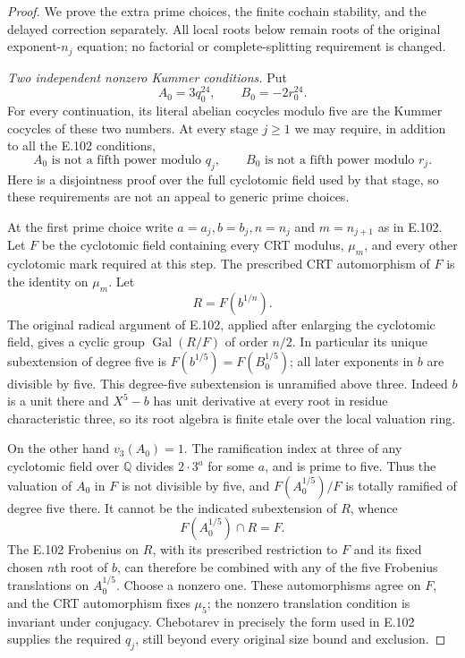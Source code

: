 \begin{proof}
We prove the extra prime choices, the finite cochain stability, and
the delayed correction separately.  All local roots below remain
roots of the original exponent-$n_j$ equation; no factorial or
complete-splitting requirement is changed.

\emph{Two independent nonzero Kummer conditions.}
Put
\[
                  A_0=3q_0^{24},\qquad B_0=-2r_0^{24}.
 \tag{E.205.4}
\]
For every continuation, its literal abelian cocycles modulo five
are the Kummer cocycles of these two numbers.  At every stage
$j\geq1$ we may require, in addition to all the E.102 conditions,
\[
 A_0\text{ is not a fifth power modulo }q_j,\qquad
 B_0\text{ is not a fifth power modulo }r_j.
 \tag{E.205.5}
\]
Here is a disjointness proof over the full cyclotomic field used
by that stage, so these requirements are not an appeal to
generic prime choices.

At the first prime choice write $a=a_j,b=b_j,n=n_j$ and
$m=n_{j+1}$ as in E.102.  Let $F$ be the cyclotomic field
containing every CRT modulus, $\mu_m$, and every other
cyclotomic mark required at this step.  The prescribed CRT
automorphism of $F$ is the identity on $\mu_m$.  Let
\[
                       R=F(b^{1/n}).
\]
The original radical argument of E.102, applied after enlarging
the cyclotomic field, gives a cyclic group
$\operatorname{Gal}(R/F)$ of order $n/2$.
In particular its unique subextension of degree five is
$F(b^{1/5})=F(B_0^{1/5})$; all later exponents in $b$ are
divisible by five.  This degree-five subextension is unramified
above three.  Indeed $b$ is a unit there and $X^5-b$ has unit
derivative at every root in residue characteristic three, so its
root algebra is finite etale over the local valuation ring.

On the other hand $v_3(A_0)=1$.  The ramification index at three
of any cyclotomic field over $\mathbb Q$ divides
$2\cdot3^a$ for some $a$, and is prime to five.  Thus the
valuation of $A_0$ in $F$ is not divisible by five, and
$F(A_0^{1/5})/F$ is totally ramified of degree five there.
It cannot be the indicated subextension of $R$, whence
\[
                       F(A_0^{1/5})\cap R=F.
 \tag{E.205.6}
\]
The E.102 Frobenius on $R$, with its prescribed restriction to
$F$ and its fixed chosen $n$th root of $b$, can therefore be
combined with any of the five Frobenius translations on
$A_0^{1/5}$.  Choose a nonzero one.  These automorphisms agree
on $F$, and the CRT automorphism fixes $\mu_5$; the nonzero
translation condition is invariant under conjugacy.  Chebotarev
in precisely the form used in E.102 supplies the required $q_j$,
still beyond every original size bound and exclusion.


\end{proof}
